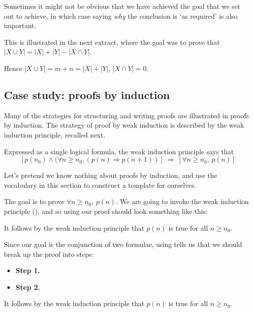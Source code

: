 Sometimes it might not be obvious that we have achieved the goal that we set out to achieve, in which case saying \textit{why} the conclusion is `as required' is also important.

This is illustrated in the next extract, where the goal was to prove that $|X \cup Y| = |X| + |Y| - |X \cap Y|$.

\begin{extract}
\label{xtrConclusionExampleTwo}
Hence $|X \cup Y| = m+n = |X| + |Y|$,  $|X \cap Y| = 0$.
\end{extract}

\subsection*{Case study: proofs by induction}

Many of the strategies for structuring and writing proofs are illustrated in proofs by induction. The strategy of proof by weak induction is described by the weak induction principle, recalled next.

\rthmWeakInduction*

Expressed as a single logical formula, the weak induction principle says that
\[ [p(n_0) \wedge (\forall n \ge n_0, (p(n) \Rightarrow p(n+1))]~\Rightarrow~[\forall n \ge n_0,~p(n)] \]

Let's pretend we know nothing about proofs by induction, and use the vocabulary in this section to construct a template for ourselves.

The goal is to prove $\forall n \ge n_0,~ p(n)$. We are going to invoke the weak induction principle (), and so using  our proof should look something like this:

\begin{snippet}

It follows by the weak induction principle that $p(n)$ is true for all $n \ge n_0$.
\end{snippet}

Since our goal is the conjunction of two formulae, using  tells us that we should break up the proof into steps:

\begin{snippet}
\begin{itemize}
\item \textbf{Step 1.} 
\item \textbf{Step 2.} 
\end{itemize}

It follows by the weak induction principle that $p(n)$ is true for all $n \ge n_0$.
\end{snippet}

